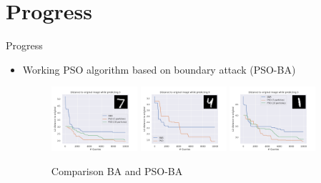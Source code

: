 \documentclass[11pt,t]{beamer}
\begin{document}
\section{Progress}
\begin{frame}{Progress}
\begin{itemize}
	\item Working PSO algorithm based on boundary attack (PSO-BA)
	\begin{figure}
	\centering
	\includegraphics[width=0.30\textwidth]{graphics/comparison_1_3.png}
	\includegraphics[width=0.30\textwidth]{graphics/comparison_42_9.png}
	\includegraphics[width=0.30\textwidth]{graphics/comparison_1302_3.png}
	\caption{Comparison BA and PSO-BA\label{fig:comparisons}}
	\footnotesize
	\flushleft
	\end{figure}
\end{itemize}
\end{frame}
\end{document}
